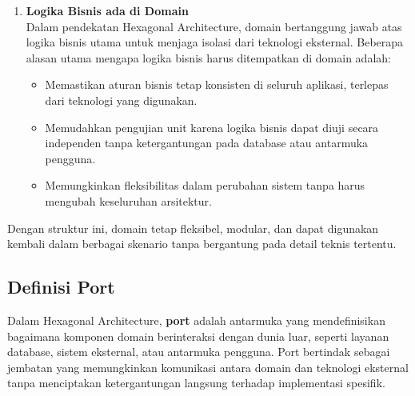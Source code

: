 \begin{enumerate}
	\item \textbf{Logika Bisnis ada di Domain} \\
	Dalam pendekatan Hexagonal Architecture, domain bertanggung jawab atas logika bisnis utama untuk menjaga isolasi dari teknologi eksternal. Beberapa alasan utama mengapa logika bisnis harus ditempatkan di domain adalah:
	\begin{itemize}
		\item Memastikan aturan bisnis tetap konsisten di seluruh aplikasi, terlepas dari teknologi yang digunakan.
		\item Memudahkan pengujian unit karena logika bisnis dapat diuji secara independen tanpa ketergantungan pada database atau antarmuka pengguna.
		\item Memungkinkan fleksibilitas dalam perubahan sistem tanpa harus mengubah keseluruhan arsitektur.
	\end{itemize}
\end{enumerate}

Dengan struktur ini, domain tetap fleksibel, modular, dan dapat digunakan kembali dalam berbagai skenario tanpa bergantung pada detail teknis tertentu.


\subsection{Definisi Port}

Dalam Hexagonal Architecture, \textbf{port} adalah antarmuka yang mendefinisikan bagaimana komponen domain berinteraksi dengan dunia luar, seperti layanan database, sistem eksternal, atau antarmuka pengguna. Port bertindak sebagai jembatan yang memungkinkan komunikasi antara domain dan teknologi eksternal tanpa menciptakan ketergantungan langsung terhadap implementasi spesifik.

